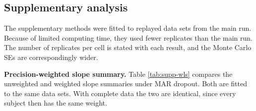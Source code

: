 \documentclass[
  11pt,
]{article}
\begin{document}
\subsection{Supplementary analysis}\label{supplementary-analysis}

The supplementary methods were fitted to replayed data sets
from the main run. Because of limited computing time, they
used fewer replicates than the main run. The number of
replicates per cell is stated with each result, and the
Monte Carlo SEs are correspondingly wider.

\textbf{Precision-weighted slope summary.} Table
\ref{tab:supp-wls} compares the unweighted and weighted slope
summaries under MAR dropout. Both are fitted to the same data
sets. With complete data the two are identical, since every
subject then has the same weight.
\end{document}
